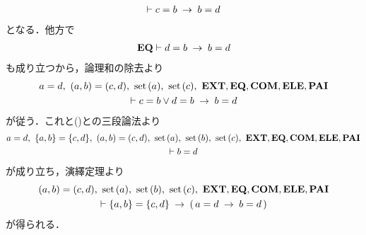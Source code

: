 \begin{sketch}
\begin{description}
\begin{align}
\begin{gathered}
						\vdash c = b \hspace{0.25em}\rightarrow\hspace{0.25em} b = d
					\end{gathered}
				\end{align}
				となる．他方で
				\begin{align}
					\mbox{{\bf EQ}} \vdash d = b \hspace{0.25em}\rightarrow\hspace{0.25em} b = d
				\end{align}
				も成り立つから，論理和の除去より
				\begin{align}
					\begin{gathered}
						a = d,\ (a,b) = (c,d),\ \set{a},\ \set{c},\ \EXTAX,\EQAX,\COMAX,\ELEAX,\PAIAX \\
						\vdash c = b \vee d = b \rarrow b = d
					\end{gathered}
				\end{align}
				が従う．これと()との三段論法より
				\begin{align}
					\begin{gathered}
						a = d,\ \{a,b\} = \{c,d\},\ (a,b) = (c,d),\ \set{a},\ \set{b},\ \set{c},\ 
						\EXTAX,\EQAX,\COMAX,\ELEAX,\PAIAX \\
						\vdash b = d
					\end{gathered}
				\end{align}
				が成り立ち，演繹定理より
				\begin{align}
					\begin{gathered}
						(a,b) = (c,d),\ \set{a},\ \set{b},\ \set{c},\ \EXTAX,\EQAX,\COMAX,\ELEAX,\PAIAX \\
						\vdash \{a,b\} = \{c,d\} \rarrow (\, a = d \rarrow b = d\, )
					\end{gathered}
					\label{fom:equality_of_ordered_pairs_12}
				\end{align}
				が得られる．
				

\end{description}
\end{sketch}
